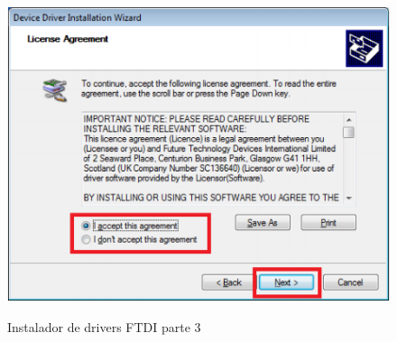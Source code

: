 \documentclass[12pt,letterpaper]{article}
\begin{document}
\begin{center}
\begin{figure}[!h]
\centering
\includegraphics[width=8 cm]{figuras/instalacion9.png}\\
\caption{Instalador de drivers FTDI parte 3}
\label{Fig11}
\end{figure}
\end{center}
\end{document}

